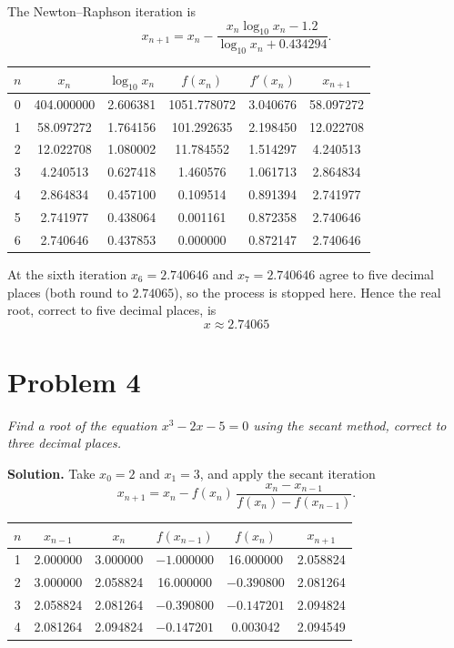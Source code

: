 \documentclass[11pt,a4paper]{article}
\begin{document}
The Newton--Raphson iteration is
\[
x_{n+1}=x_{n}-\frac{x_{n}\log_{10}x_{n}-1.2}{\log_{10}x_{n}+0.434294}.
\]

\begin{center}
\begin{tabular}{cccccc}
\toprule
$n$ & $x_{n}$ & $\log_{10}x_{n}$ & $f(x_{n})$ & $f'(x_{n})$ & $x_{n+1}$ \\
\midrule
0 & 404.000000 & 2.606381 & 1051.778072 & 3.040676 & 58.097272 \\
1 & 58.097272  & 1.764156 & 101.292635  & 2.198450 & 12.022708 \\
2 & 12.022708  & 1.080002 & 11.784552   & 1.514297 & 4.240513 \\
3 & 4.240513   & 0.627418 & 1.460576    & 1.061713 & 2.864834 \\
4 & 2.864834   & 0.457100 & 0.109514    & 0.891394 & 2.741977 \\
5 & 2.741977   & 0.438064 & 0.001161    & 0.872358 & 2.740646 \\
6 & 2.740646   & 0.437853 & 0.000000    & 0.872147 & 2.740646 \\
\bottomrule
\end{tabular}
\end{center}
At the sixth
iteration $x_{6}=2.740646$ and $x_{7}=2.740646$ agree to five decimal places (both
round to $2.74065$), so the process is stopped here. Hence the real root, correct to
five decimal places, is
\[
\boxed{x \approx 2.74065}
\]

\section*{Problem 4}
\textit{Find a root of the equation $x^{3}-2x-5=0$ using the secant method, correct
to three decimal places.}

\textbf{Solution.} Take $x_{0}=2$ and
$x_{1}=3$, and apply the secant iteration
\[
x_{n+1}=x_{n}-f(x_{n})\,\frac{x_{n}-x_{n-1}}{f(x_{n})-f(x_{n-1})}.
\]

\begin{center}
\begin{tabular}{cccccc}
\toprule
$n$ & $x_{n-1}$ & $x_{n}$ & $f(x_{n-1})$ & $f(x_{n})$ & $x_{n+1}$ \\
\midrule
1 & 2.000000 & 3.000000 & $-1.000000$ & 16.000000 & 2.058824 \\
2 & 3.000000 & 2.058824 & 16.000000 & $-0.390800$ & 2.081264 \\
3 & 2.058824 & 2.081264 & $-0.390800$ & $-0.147201$ & 2.094824 \\
4 & 2.081264 & 2.094824 & $-0.147201$ & 0.003042 & 2.094549 \\
\bottomrule
\end{tabular}
\end{center}
\end{document}
